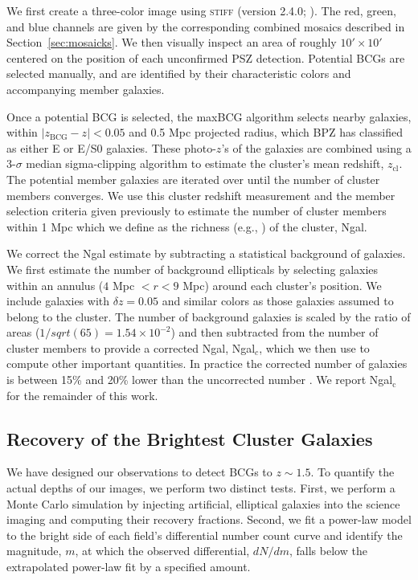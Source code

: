 \documentclass[apj, revtex4-1]{emulateapj}
\newcommand{\eg}{e.g.}
\newcommand{\citeeg}[1]{(\eg, \citealt{#1})}
\begin{document}
We first create a three-color image using \textsc{stiff} (version 2.4.0; \citealt{Bertin2011}). The red, green, and blue channels are given by the corresponding combined mosaics described in Section~\ref{sec:mosaicks}. We then visually inspect an area of roughly $10' \times 10'$ centered on the position of each unconfirmed PSZ detection. Potential BCGs are selected manually, and are identified by their characteristic colors and accompanying member galaxies.

Once a potential BCG is selected, the maxBCG algorithm selects nearby galaxies, within $|z_\mathrm{BCG} - z| < 0.05$ and 0.5 Mpc projected radius, which BPZ has classified as either E or E/S0 galaxies. These photo-$z$'s of the galaxies are combined using a 3-$\sigma$ median sigma-clipping algorithm to estimate the cluster's mean redshift, $z_\mathrm{cl}$. The potential member galaxies are iterated over until the number of cluster members converges. We use this cluster redshift measurement and the member selection criteria given previously to estimate the number of cluster members within 1 Mpc which we define as the richness \citeeg{Abell1958} of the cluster, Ngal.

We correct the Ngal estimate by subtracting a statistical background of galaxies. We first estimate the number of background ellipticals by selecting galaxies within an annulus ($4$ Mpc $<r < 9$ Mpc) around each cluster's position. We include galaxies with $\delta z = 0.05$ and similar colors as those galaxies assumed to belong to the cluster. The number of background galaxies is scaled by the ratio of areas ($1/sqrt(65)=1.54\times 10^{-2}$) and then subtracted  from the number of cluster members to provide a corrected Ngal, Ngal$_c$, which we then use to compute other important quantities. In practice the corrected number of galaxies is between 15\% and 20\% lower than the uncorrected number \citep{Menanteau2010}. We report Ngal$_\mathrm{c}$ for the remainder of this work.

\subsection{Recovery of the Brightest Cluster Galaxies}\label{sec:cluster finding}
We have designed our observations to detect BCGs to $z\sim1.5$. To quantify the actual depths of our images, we perform two distinct tests. First, we perform a Monte Carlo simulation by injecting artificial, elliptical galaxies into the science imaging and computing their recovery fractions. Second, we fit a power-law model to the bright side of each field's differential number count curve and identify the magnitude, $m$, at which  the observed differential, $dN/dm$, falls below the extrapolated power-law fit by a specified amount.
\end{document}
